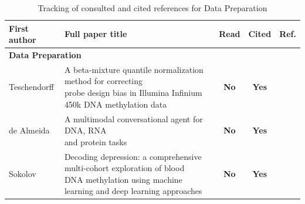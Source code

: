 \documentclass[10pt]{extarticle}
\newcommand{\yes}{\cellcolor{yesgreen}\textbf{Yes}}
\newcommand{\noo}{\cellcolor{nored}\textbf{No}}
\begin{document}
\begin{table}[H]
    \centering
    \caption{Tracking of consulted and cited references for Data Preparation}
    \label{tab:biblio-tracking-preparation}

    \begin{tabular}{|l|l|c|c|c|}
        \hline
        \textbf{First author} &
        \textbf{Full paper title} &
        \textbf{Read} &
        \textbf{Cited} &
        \textbf{Ref.} \\
        \hline
        \multicolumn{5}{|l|}{\cellcolor{catbg}\textbf{Data Preparation}} \\
        \hline

        Teschendorff &
        \makecell[l]{A beta-mixture quantile normalization method for correcting\\
        probe design bias in Illumina Infinium 450k DNA methylation data} &
        \noo & \yes & \cite{Teschendorff2013} \\
        \hline

        de Almeida &
        \makecell[l]{A multimodal conversational agent for DNA, RNA\\
        and protein tasks} &
        \noo & \yes & \cite{deAlmeida2025} \\
        \hline

        Sokolov &
        \makecell[l]{Decoding depression: a comprehensive multi-cohort exploration of blood\\ DNA methylation using machine learning and deep learning approaches} &
        \noo & \yes & \cite{Sokolov2024} \\
        \hline

    \end{tabular}
\end{table}
\end{document}
